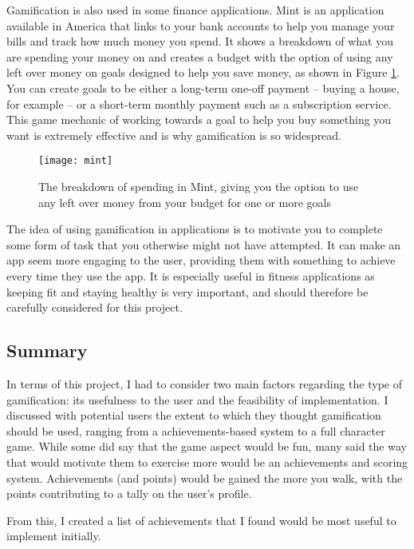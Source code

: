 Gamification is also used in some finance applications. Mint \cite{IntuitInc.} is an application available in America that links to your bank accounts to help you manage your bills and track how much money you spend. It shows a breakdown of what you are spending your money on and creates a budget with the option of using any left over money on goals designed to help you save money, as shown in Figure \ref{fig:mint}. You can create goals to be either a long-term one-off payment -- buying a house, for example -- or a short-term monthly payment such as a subscription service. This game mechanic of working towards a goal to help you buy something you want is extremely effective and is why gamification is so widespread.

\begin{figure}[hbt]
  \centering
  \texttt{[image: mint]}
  \caption{The breakdown of spending in Mint, giving you the option to use any left over money from your budget for one or more goals \cite{IntuitInc.a}}
  \label{fig:mint}
\end{figure}

The idea of using gamification in applications is to motivate you to complete some form of task that you otherwise might not have attempted. It can make an app seem more engaging to the user, providing them with something to achieve every time they use the app. It is especially useful in fitness applications as keeping fit and staying healthy is very important, and should therefore be carefully considered for this project.

\subsection{Summary} \label{subsection:background-gamification-summary}

In terms of this project, I had to consider two main factors regarding the type of gamification: its usefulness to the user and the feasibility of implementation. I discussed with potential users the extent to which they thought gamification should be used, ranging from a achievements-based system to a full character game. While some did say that the game aspect would be fun, many said the way that would motivate them to exercise more would be an achievements and scoring system. Achievements (and points) would be gained the more you walk, with the points contributing to a tally on the user's profile.

From this, I created a list of achievements that I found would be most useful to implement initially.

